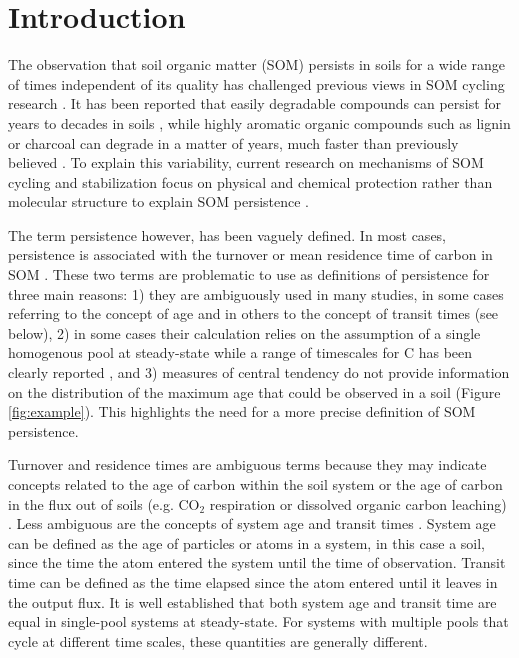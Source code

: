 \documentclass[draft,linenumbers]{agujournal}
\begin{document}
\section{Introduction}
The observation that soil organic matter (SOM) persists in soils for a wide range of times independent of its quality has challenged previous views in SOM cycling research \citep{Kleber2010, Schmidt2011, Dungait2012, Gleixner2013, Paul2016}. It has been reported that easily degradable compounds can persist for years to decades in soils \citep{Kiem2003, Kleber2010}, while highly aromatic organic compounds such as lignin or charcoal can degrade in a matter of years, much faster than previously believed \citep{Gleixner1999, Kleber2010, Heim2007, Lehmann2015}. %
To explain this variability, current research on mechanisms of SOM cycling and stabilization focus on physical and chemical protection rather than molecular structure to explain SOM persistence \citep{Schmidt2011, LehmannKleber}. 

The term persistence however, has been vaguely defined. In most cases, persistence is associated with the turnover or mean residence time of carbon in SOM \citep{Schmidt2011, Derrien2011, Lehmann2015}. These two terms are problematic to use as definitions of persistence for three main reasons: 1) they are ambiguously used in many studies, in some cases referring to the concept of age and in others to the concept of transit times (see below), 2) in some cases their calculation relies on the assumption of a single homogenous pool at steady-state while a range of timescales for C has been clearly reported \citep{Trumbore2000, Trumbore2009}, and 3) measures of central tendency do not provide information on the distribution of the maximum age that could be observed in a soil (Figure \ref{fig:example}). This highlights the need for a more precise definition of SOM persistence. %

Turnover and residence times are ambiguous terms because they may indicate concepts related to the age of carbon within the soil system or the age of carbon in the flux out of soils (e.g. CO$_2$ respiration or dissolved organic carbon leaching) \citep{Sierra2017}. Less ambiguous are the concepts of system age and transit times \citep{Bolin1973, Bruun2004, Derrien2011, Manzoni2009, Sierra2017}. System age can be defined as the age of particles or atoms in a system, in this case a soil, since the time the atom entered the system until the time of observation. Transit time can be defined as the time elapsed since the atom entered until it leaves in the output flux. It is well established that both system age and transit time are equal in single-pool systems at steady-state. For systems with multiple pools that cycle at different time scales, these quantities are generally different. 
\end{document}
